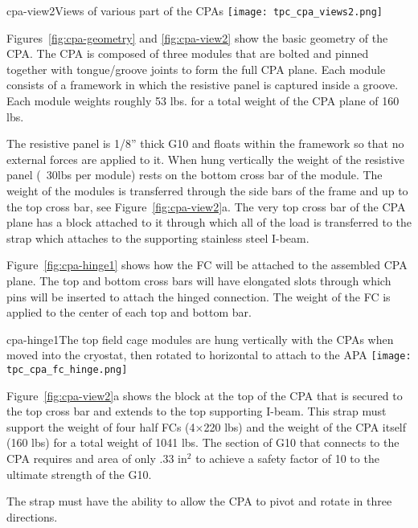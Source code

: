 \begin{cdrfigure}{cpa-view2}{Views of various part of the CPAs} 
\texttt{[image: tpc\_cpa\_views2.png]}
\end{cdrfigure}


Figures~\ref{fig:cpa-geometry} and \ref{fig:cpa-view2} show the basic geometry of the CPA.  The CPA is composed of three modules that are bolted and pinned together with tongue/groove joints to form the full CPA plane.  Each module consists of a framework in which the resistive panel is captured inside a groove.  Each module weights roughly 53 lbs. for a total weight of the CPA plane of 160 lbs.  

The resistive panel is 1/8'' thick G10 and floats within the framework so that no external forces are applied to it.  When hung vertically the weight of the resistive panel (~30lbs per module) rests on the bottom cross bar of the module.  The weight of the modules is transferred through the side bars of the frame and up to the top cross bar, see Figure~\ref{fig:cpa-view2}a.  The very top cross bar of the CPA plane has a block attached to it through which all of the load is transferred to the strap which attaches to the supporting stainless steel I-beam.  

Figure~\ref{fig:cpa-hinge1} shows how the FC will be attached to the assembled CPA plane.  The top and bottom cross bars will have elongated slots through which pins will be inserted to attach the hinged connection.  The weight of the FC is applied to the center of each top and bottom bar.  

\begin{cdrfigure}{cpa-hinge1}{The top field cage modules are hung vertically with the CPAs when moved into the cryostat, then rotated to horizontal to attach to the APA} 
\texttt{[image: tpc\_cpa\_fc\_hinge.png]}
\end{cdrfigure}


Figure~\ref{fig:cpa-view2}a shows the block at the top of the CPA that is secured to the top cross bar and extends to the top supporting I-beam.  This strap must support the weight of four half FCs (4$\times$220 lbs) and the weight of the CPA itself (160 lbs) for a total weight of 1041 lbs. The section of G10 that connects to the CPA requires and area of only .33 in$^2$ to achieve a safety factor of 10 to the ultimate strength of the G10.  

The strap must have the ability to allow the CPA to pivot and rotate in three directions.  


